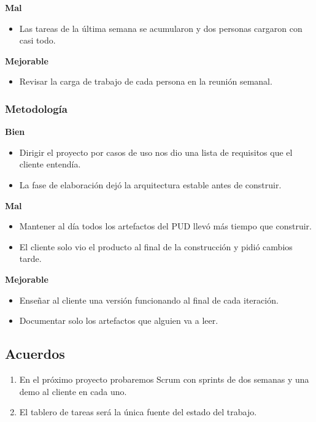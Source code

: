 \documentclass[11pt,a4paper]{article}
\begin{document}
\textbf{Mal}

\begin{itemize}
\item Las tareas de la última semana se acumularon y dos personas cargaron con casi todo.
\end{itemize}

\textbf{Mejorable}

\begin{itemize}
\item Revisar la carga de trabajo de cada persona en la reunión semanal.
\end{itemize}

\subsubsection*{Metodología}

\textbf{Bien}

\begin{itemize}
\item Dirigir el proyecto por casos de uso nos dio una lista de requisitos que el cliente entendía.
\item La fase de elaboración dejó la arquitectura estable antes de construir.
\end{itemize}

\textbf{Mal}

\begin{itemize}
\item Mantener al día todos los artefactos del PUD llevó más tiempo que construir.
\item El cliente solo vio el producto al final de la construcción y pidió cambios tarde.
\end{itemize}

\textbf{Mejorable}

\begin{itemize}
\item Enseñar al cliente una versión funcionando al final de cada iteración.
\item Documentar solo los artefactos que alguien va a leer.
\end{itemize}

\subsection*{Acuerdos}

\begin{enumerate}
\item En el próximo proyecto probaremos Scrum con sprints de dos semanas y una demo al cliente en cada uno.
\item El tablero de tareas será la única fuente del estado del trabajo.
\end{enumerate}
\end{document}
